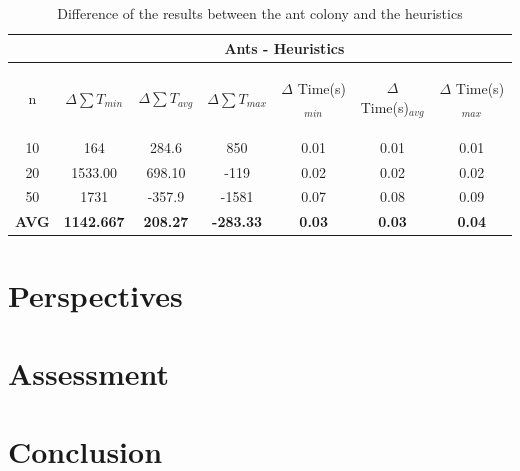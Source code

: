 \documentclass[UTF8, twoside]{EPURapport}
\begin{document}
\begin{table}[!h]
\centering
\setlength{\extrarowheight}{1.5pt}
\begin{tabular}{|c|c|c|c|c|c|c|} 
\hline
 & \multicolumn{6}{c|}{Ants - Heuristics} \\
\hline
n & $\Delta \sum T_{min}$ & $\Delta \sum T_{avg}$ & $\Delta \sum T_{max}$ & \begin{sideways}$\Delta$ Time(s)$_{min}$ \end{sideways} & \begin{sideways}$\Delta$ Time(s)$_{avg}$ \end{sideways} & \begin{sideways}$\Delta$ Time(s)$_{max}$ \end{sideways}\\
\hline
10 & \cellcolor{red}164 & \cellcolor{red}284.6 & \cellcolor{red}850 & \cellcolor{red}0.01 & \cellcolor{red}0.01 & \cellcolor{red}0.01\\
\hline
20 & \cellcolor{red}1533.00 & \cellcolor{red}698.10 & \cellcolor{green}-119 & \cellcolor{red}0.02 & \cellcolor{red}0.02 & \cellcolor{red}0.02\\
\hline
50 & \cellcolor{red}1731 & \cellcolor{green}-357.9 & \cellcolor{green}-1581 & \cellcolor{red}0.07 & \cellcolor{red}0.08 & \cellcolor{red}0.09\\
\hline
\textbf{AVG} & \cellcolor{red}\textbf{1142.667} & \cellcolor{red}\textbf{208.27} & \cellcolor{green}\textbf{-283.33} & \cellcolor{red}\textbf{0.03} & \cellcolor{red}\textbf{0.03} & \cellcolor{red}\textbf{0.04}\\
\hline
\end{tabular}
\caption{\label{tab:diff}Difference of the results between the ant colony and the heuristics}
\end{table}



\chapter{Perspectives}

\chapter{Assessment}

\chapter{Conclusion}
\end{document}
